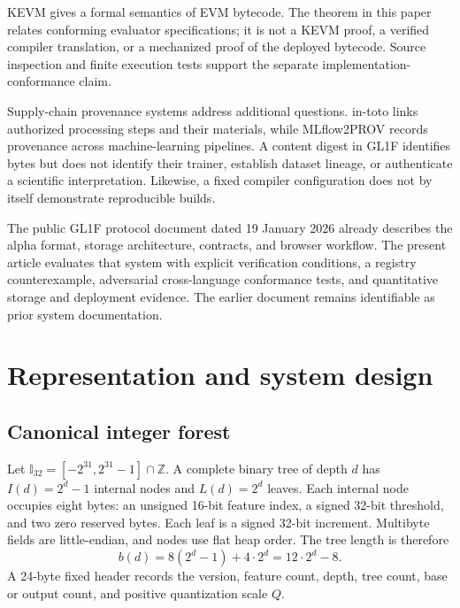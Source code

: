 \documentclass{ledger}
\newcommand{\Ithirtytwo}{\mathbb{I}_{32}}
\begin{document}
KEVM gives a formal semantics of EVM bytecode.\cite{hildenbrandt2018kevm}
The theorem in this paper relates conforming evaluator specifications; it is
not a KEVM proof, a verified compiler translation, or a mechanized proof of
the deployed bytecode. Source inspection and finite execution tests support
the separate implementation-conformance claim.

Supply-chain provenance systems address additional questions. in-toto
links authorized processing steps and their materials,\cite{torresarias2019intoto}
while MLflow2PROV records provenance across machine-learning pipelines.
\cite{schlegel2025provenance} A content digest in GL1F identifies bytes but
does not identify their trainer, establish dataset lineage, or authenticate a
scientific interpretation. Likewise, a fixed compiler configuration does not
by itself demonstrate reproducible builds.\cite{lamb2022reproducible}

The public GL1F protocol document dated 19 January 2026 already describes the
alpha format, storage architecture, contracts, and browser workflow.
\cite{gl1fprotocol2026} The present article evaluates that system with
explicit verification conditions, a registry counterexample, adversarial
cross-language conformance tests, and quantitative storage and deployment
evidence. The earlier document remains identifiable as prior system
documentation.

\section{Representation and system design}
\label{sec:design}

\subsection{Canonical integer forest}

Let $\Ithirtytwo=[-2^{31},2^{31}-1]\cap\mathbb Z$. A complete binary tree of
depth $d$ has $I(d)=2^d-1$ internal nodes and $L(d)=2^d$ leaves. Each internal
node occupies eight bytes: an unsigned 16-bit feature index, a signed 32-bit
threshold, and two zero reserved bytes. Each leaf is a signed 32-bit
increment. Multibyte fields are little-endian, and nodes use flat heap order.
The tree length is therefore
\begin{equation}
 b(d)=8(2^d-1)+4\cdot2^d=12\cdot2^d-8.
 \label{eq:treebytes}
\end{equation}
A 24-byte fixed header records the version, feature count, depth, tree count,
base or output count, and positive quantization scale $Q$.
\end{document}
